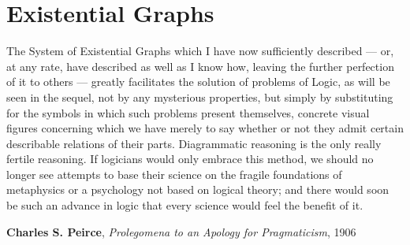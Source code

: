 \setchapterpreamble[u]{\margintoc}
\chapter{Existential Graphs}

\epigraph{The System of Existential Graphs which I have now sufficiently
described --- or, at any rate, have described as well as I know how, leaving the
further perfection of it to others --- greatly facilitates the solution of
problems of Logic, as will be seen in the sequel, not by any mysterious
properties, but simply by substituting for the symbols in which such problems
present themselves, concrete visual figures concerning which we have merely to
say whether or not they admit certain describable relations of their parts.
Diagrammatic reasoning is the only really fertile reasoning. If logicians would
only embrace this method, we should no longer see attempts to base their science
on the fragile foundations of metaphysics or a psychology not based on logical
theory; and there would soon be such an advance in logic that every science
would feel the benefit of it.}{\textbf{Charles S. Peirce}, \textit{Prolegomena
to an Apology for Pragmaticism}, 1906}


